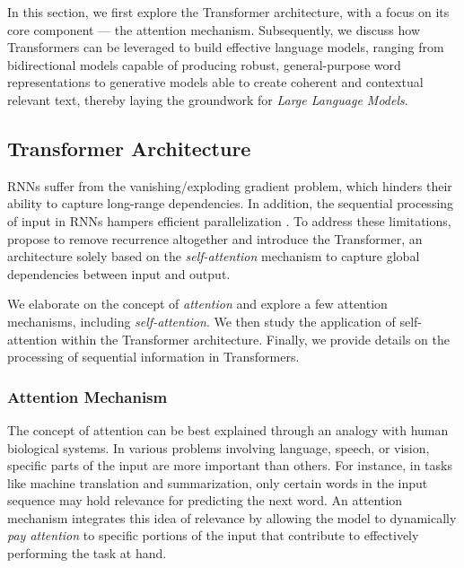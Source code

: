 In this section, we first explore the Transformer architecture, with a focus on its core component — the attention mechanism. Subsequently, we discuss how Transformers can be leveraged to build effective language models, ranging from bidirectional models capable of producing robust, general-purpose word representations to generative models able to create coherent and contextual relevant text, thereby laying the groundwork for \textit{Large Language Models}.




\subsection{Transformer Architecture}

\acp{RNN} suffer from the vanishing/exploding gradient problem, which hinders their ability to capture long-range dependencies. In addition, the sequential processing of input in \acp{RNN} hampers efficient parallelization \citep{vaswani2017attention}. To address these limitations, \citet{vaswani2017attention} propose to remove recurrence altogether and introduce the Transformer, an architecture solely based on the \textit{self-attention} mechanism to capture global dependencies between input and output. 

We elaborate on the concept of \textit{attention} and explore a few attention mechanisms, including \textit{self-attention}. We then study the application of self-attention within the Transformer architecture. Finally, we provide details on the processing of sequential information in Transformers.

\subsubsection{Attention Mechanism} 

The concept of attention can be best explained through an analogy with human biological systems. In various problems involving language, speech, or vision, specific parts of the input are more important than others. For instance, in tasks like machine translation and summarization, only certain words in the input sequence may hold relevance for predicting the next word. An attention mechanism integrates this idea of relevance by allowing the model to dynamically \textit{pay attention} to specific portions of the input that contribute to effectively performing the task at hand.

